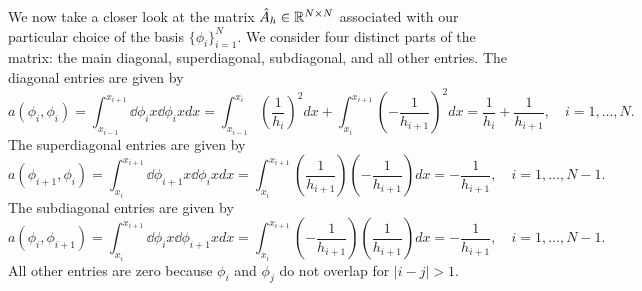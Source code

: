 
We now take a closer look at the matrix $\hat A_h \in \mathbb{R}^{N \times N}$ associated with our particular choice of the basis $\{\phi_i\}_{i=1}^N$.  We consider four distinct parts of the matrix: the main diagonal, superdiagonal, subdiagonal, and all other entries.  The diagonal entries are given by 
\begin{equation*}
  a(\phi_i,\phi_i) = \int_{x_{i-1}}^{x_{i+1}} \dd{\phi_i}{x} \dd{\phi_i}{x} dx
  = \int_{x_{i-1}}^{x_{i}} \left( \frac{1}{h_i} \right)^2 dx +
  \int_{x_{i}}^{x_{i+1}} \left( - \frac{1}{h_{i+1}} \right)^2 dx
  = \frac{1}{h_i} + \frac{1}{h_{i+1}}, \quad i = 1,\dots,N.
\end{equation*}
The superdiagonal entries are given by
\begin{equation*}
  a(\phi_{i+1},\phi_i) =
  \int_{x_i}^{x_{i+1}} \dd{\phi_{i+1}}{x} \dd{\phi_i}{x} dx
  = \int_{x_i}^{x_{i+1}}  \left( \frac{1}{h_{i+1}} \right) \left( - \frac{1}{h_{i+1}} \right) dx
  = - \frac{1}{h_{i+1}}, \quad i = 1,\dots,N-1.
\end{equation*}
The subdiagonal entries are given by
\begin{equation*}
    a(\phi_i,\phi_{i+1}) =
  \int_{x_i}^{x_{i+1}} \dd{\phi_i}{x} \dd{\phi_{i+1}}{x} dx
  = \int_{x_i}^{x_{i+1}} \left( - \frac{1}{h_{i+1}} \right) \left( \frac{1}{h_{i+1}} \right) dx
  = - \frac{1}{h_{i+1}}, \quad i = 1,\dots,N-1.
\end{equation*}
All other entries are zero because $\phi_i$ and $\phi_j$ do not overlap for $|i -j| > 1$.


